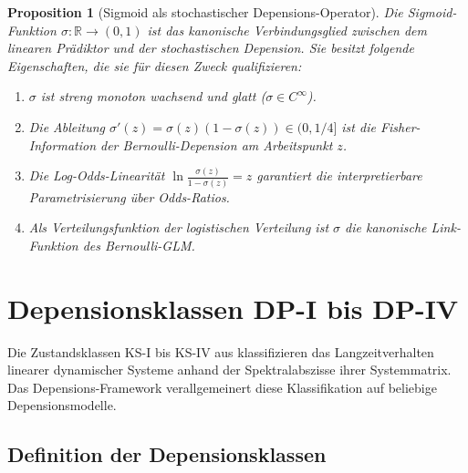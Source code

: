 ﻿\documentclass[12pt, a4paper]{article}
\newtheorem{proposition}[theorem]{Proposition}
\theoremstyle{definition}
\theoremstyle{remark}
\newcommand{\R}{\mathbb{R}}
\newcommand{\sigmoid}{\sigma}
\begin{document}
\begin{proposition}[Sigmoid als stochastischer Depensions-Operator]
\label{prop:sigmoid}
Die Sigmoid-Funktion $\sigmoid: \R \to (0,1)$ ist das kanonische Verbindungsglied
zwischen dem linearen Prädiktor und der stochastischen Depension. Sie besitzt
folgende Eigenschaften, die sie für diesen Zweck qualifizieren:
\begin{enumerate}[label=(\roman*)]
  \item $\sigmoid$ ist streng monoton wachsend und glatt ($\sigmoid \in C^\infty$).
  \item Die Ableitung $\sigmoid'(z) = \sigmoid(z)(1-\sigmoid(z)) \in (0, 1/4]$
    ist die Fisher-Information der Bernoulli-Depension am Arbeitspunkt $z$.
  \item Die Log-Odds-Linearität $\ln\frac{\sigmoid(z)}{1-\sigmoid(z)} = z$ garantiert
    die interpretierbare Parametrisierung über Odds-Ratios.
  \item Als Verteilungsfunktion der logistischen Verteilung ist $\sigmoid$ die
    kanonische Link-Funktion des Bernoulli-GLM.
\end{enumerate}
\end{proposition}

\section{Depensionsklassen DP-I bis DP-IV}
\label{sec:klassen}

Die Zustandsklassen KS-I bis KS-IV aus \citet{epp2026sysstate} klassifizieren das
Langzeitverhalten linearer dynamischer Systeme anhand der Spektralabszisse ihrer
Systemmatrix. Das Depensions-Framework verallgemeinert diese Klassifikation auf
beliebige Depensionsmodelle.

\subsection{Definition der Depensionsklassen}
\end{document}
